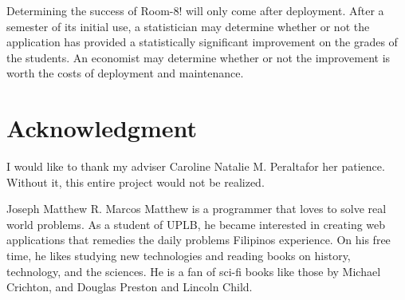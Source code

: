 \documentclass[journal]{IEEEtran}
\newcommand{\ADVISEE}{Joseph Matthew R. Marcos}
\newcommand{\ADVISER}{Caroline Natalie M. Peralta}
\begin{document}
Determining the success of Room-8! will only come after deployment. After a semester of its initial use, a statistician
may determine whether or not the application has provided a statistically significant improvement on the grades of the
students. An economist may determine whether or not the improvement is worth the costs of deployment and maintenance.

\newpage
\section*{Acknowledgment}
I would like to thank my adviser \ADVISER for her patience. Without it, this entire project would not be realized.
\begin{biography}{\ADVISEE}
    Matthew is a programmer that loves to solve real world problems. As a student of UPLB, he became interested in creating
    web applications that remedies the daily problems Filipinos experience. On his free time, he likes studying new
    technologies and reading books on history, technology, and the sciences. He is a fan of sci-fi books like those by
    Michael Crichton, and Douglas Preston and Lincoln Child.
\end{biography}


\newpage
% 



\newpage
\appendices
\end{document}

